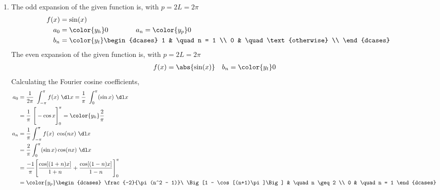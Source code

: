 \begin{enumerate}
    \item The odd expansion of the given function is, with $  p = 2L = 2\pi $
          \begin{align}
              f(x) & = \sin(x)                                \\
              a_0  & = {\color{y_h} 0} \qquad\qquad
              a_n = {\color{y_p} 0}                           \\
              b_n  & = \color{y_t} \begin{dcases}
                                       1 & \quad n = 1            \\
                                       0 & \quad \text{otherwise} \\
                                   \end{dcases}
          \end{align}
          The even expansion of the given function is, with $  p = 2L = 2\pi $
          \begin{align}
              f(x) & = \abs{\sin(x)} &
              b_n  & = \color{y_t} 0
          \end{align}
          Calculating the Fourier cosine coefficients,
          \begin{align}
              a_0 & = \frac{1}{2\pi}\ \int_{-\pi}^{\pi} f(x)\ \dl x
              = \frac{1}{\pi}\ \int_{0}^{\pi} (\sin x)\ \dl x               \\
                  & =  \frac{1}{\pi}\ \Bigg[ -\cos x \Bigg]_{0}^{\pi}
              = \color{y_h} \frac{2}{\pi}                                   \\
              a_n & = \frac{1}{\pi} \int_{-\pi}^{\pi} f(x)\ \cos(nx)\ \dl x \\
                  & = \frac{2}{\pi} \int_{0}^{\pi} (\sin x) \cos(nx)\ \dl x \\
                  & = \frac{-1}{\pi}\Bigg[ \frac{\cos[(1+n)x]}{1+n}
              + \frac{\cos[(1-n)x]}{1-n} \Bigg]_{0}^{\pi}                   \\
                  & = \color{y_p}
              \begin{dcases}
                  \frac{-2}{\pi (n^2 - 1)}\ \Big[1 - \cos[(n+1)\pi]\Big] &
                  \quad n \geq 2                                           \\
                  0                                                      &
                  \quad n = 1
              \end{dcases}
          \end{align}


\end{enumerate}
